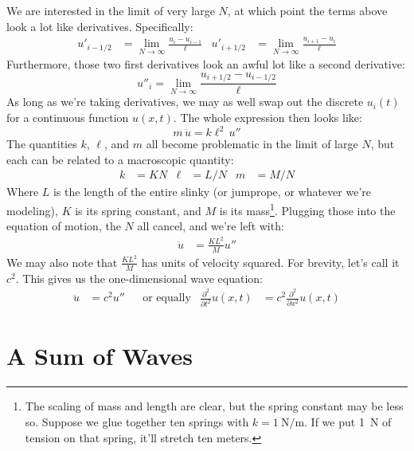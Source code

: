 \documentclass{article}
\begin{document}
We are interested in the limit of very large $N$, at which point the terms above look a lot like derivatives. Specifically:
\begin{align*}
    u'_{i-1/2} &= \lim_{N\rightarrow\infty}\frac{u_i - u_{i-1}}{\ell}&
    u'_{i+1/2} &= \lim_{N\rightarrow\infty} \frac{u_{i+1} - u_i}{\ell}
\end{align*}
Furthermore, those two first derivatives look an awful lot like a second derivative:
$$
u''_i = \lim_{N\rightarrow\infty} \frac{u_{i+1/2} - u_{i-1/2}}{\ell}
$$
As long as we're taking derivatives, we may as well swap out the discrete $u_i(t)$ for a continuous function $u(x, t)$. The whole expression then looks like:
$$
m \, \ddot{u} = k \ell^2 \, u''
$$
The quantities $k$, $\ell$, and $m$ all become problematic in the limit of large $N$, but each can be related to a macroscopic quantity:
\begin{align*}
    k &= KN &
    \ell &= L/N &
    m &= M/N
\end{align*}
Where $L$ is the length of the entire slinky (or jumprope, or whatever we're modeling), $K$ is its spring constant, and $M$ is its mass\footnote{The scaling of mass and length are clear, but the spring constant may be less so. Suppose we glue together ten springs with $k=\SI{1}{\newton/\m}$. If we put \SI{1}{\newton} of tension on that spring, it'll stretch ten meters.}. Plugging those into the equation of motion, the $N$ all cancel, and we're left with:
\begin{align*}
    \ddot{u} &= \frac{KL^2}{M} u''
\end{align*}
We may also note that $\tfrac{KL^2}{M}$ has units of velocity squared. For brevity, let's call it $c^2$. This gives us the one-dimensional wave equation:
\begin{align*}
    \ddot{u} &= c^2 u''&
    &\text{or equally}&
    \frac{\partial^2}{\partial t^2} u(x, t) &= c^2 \frac{\partial^2}{\partial x^2} u(x, t)
\end{align*}

\section*{A Sum of Waves}
\end{document}
